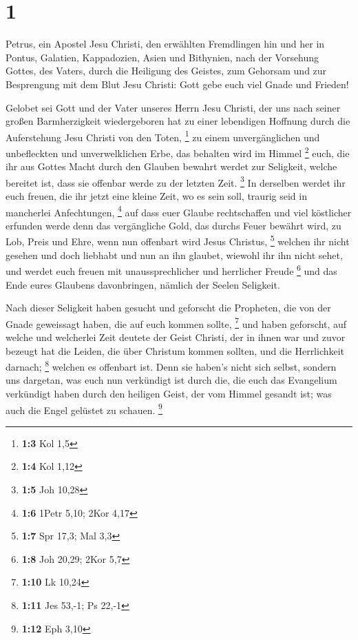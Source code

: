 \hypertarget{section}{%
\section{1}\label{section}}

 Petrus, ein Apostel Jesu Christi, den erwählten Fremdlingen
hin und her in Pontus, Galatien, Kappadozien, Asien und Bithynien,
 nach der Vorsehung Gottes, des Vaters, durch die Heiligung
des Geistes, zum Gehorsam und zur Besprengung mit dem Blut Jesu Christi:
Gott gebe euch viel Gnade und Frieden!

 Gelobet sei Gott und der Vater unseres Herrn Jesu Christi,
der uns nach seiner großen Barmherzigkeit wiedergeboren hat zu einer
lebendigen Hoffnung durch die Auferstehung Jesu Christi von den Toten,
\footnote{\textbf{1:3} Kol 1,5}  zu einem unvergänglichen
und unbefleckten und unverwelklichen Erbe, das behalten wird im Himmel
\footnote{\textbf{1:4} Kol 1,12}  euch, die ihr aus Gottes
Macht durch den Glauben bewahrt werdet zur Seligkeit, welche bereitet
ist, dass sie offenbar werde zu der letzten Zeit. \footnote{\textbf{1:5}
  Joh 10,28}  In derselben werdet ihr euch freuen, die ihr
jetzt eine kleine Zeit, wo es sein soll, traurig seid in mancherlei
Anfechtungen, \footnote{\textbf{1:6} 1Petr 5,10; 2Kor 4,17} 
auf dass euer Glaube rechtschaffen und viel köstlicher erfunden werde
denn das vergängliche Gold, das durchs Feuer bewährt wird, zu Lob, Preis
und Ehre, wenn nun offenbart wird Jesus Christus, \footnote{\textbf{1:7}
  Spr 17,3; Mal 3,3}  welchen ihr nicht gesehen und doch
liebhabt und nun an ihn glaubet, wiewohl ihr ihn nicht sehet, und werdet
euch freuen mit unaussprechlicher und herrlicher Freude \footnote{\textbf{1:8}
  Joh 20,29; 2Kor 5,7}  und das Ende eures Glaubens
davonbringen, nämlich der Seelen Seligkeit.

 Nach dieser Seligkeit haben gesucht und geforscht die
Propheten, die von der Gnade geweissagt haben, die auf euch kommen
sollte, \footnote{\textbf{1:10} Lk 10,24}  und haben
geforscht, auf welche und welcherlei Zeit deutete der Geist Christi, der
in ihnen war und zuvor bezeugt hat die Leiden, die über Christum kommen
sollten, und die Herrlichkeit darnach; \footnote{\textbf{1:11} Jes
  53,-1; Ps 22,-1}  welchen es offenbart ist. Denn sie
haben's nicht sich selbst, sondern uns dargetan, was euch nun verkündigt
ist durch die, die euch das Evangelium verkündigt haben durch den
heiligen Geist, der vom Himmel gesandt ist; was auch die Engel gelüstet
zu schauen. \footnote{\textbf{1:12} Eph 3,10}


